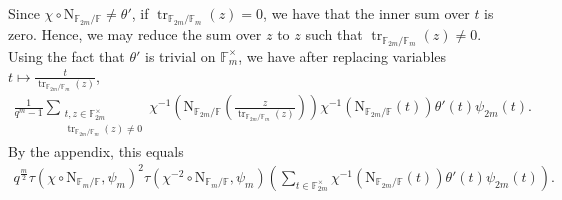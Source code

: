 \documentclass[12pt, reqno]{amsart}
\theoremstyle{definition}
\theoremstyle{definition}
\theoremstyle{definition}
\newcommand{\multiplicativegroup}[1]{#1^{\times}}
\newcommand{\fieldCharacter}{\psi}
\newcommand{\trace}{\operatorname{tr}}
\newcommand{\aFieldNorm}{\mathrm{N}}
\newcommand{\finiteField}{\mathbb{F}}
\newcommand{\finiteFieldExtension}[1]{\finiteField_{#1}}
\newcommand{\GaussSumSingleCharacter}[2]{\tau\left(#1, #2\right)}
\begin{document}
Since $\chi \circ \aFieldNorm_{\finiteFieldExtension{2m} \slash \finiteField} \ne \theta'$, if $\trace_{\finiteFieldExtension{2m} \slash \finiteFieldExtension{m}}\left(z\right) = 0$, we have that the inner sum over $t$ is zero. Hence, we may reduce the sum over $z$ to $z$ such that $\trace_{\finiteFieldExtension{2m} \slash \finiteFieldExtension{m}}\left(z\right) \ne 0$. Using the fact that $\theta'$ is trivial on $\multiplicativegroup{\finiteFieldExtension{m}}$, we have after replacing variables $t \mapsto \frac{t}{\trace_{\finiteFieldExtension{2m} \slash \finiteFieldExtension{m}}\left(z\right)}$,
\begin{align*}
	\frac{1}{q^m-1}\sum_{\substack{t,z \in \multiplicativegroup{\finiteFieldExtension{2m}}\\
			\trace_{\finiteFieldExtension{2m} \slash \finiteFieldExtension{m}}\left(z\right) \ne 0}} \chi^{-1}\left(\aFieldNorm_{\finiteFieldExtension{2m} \slash \finiteField}\left(\frac{z}{\trace_{\finiteFieldExtension{2m} \slash \finiteFieldExtension{m}}\left(z\right) }\right)\right) \chi^{-1}\left(\aFieldNorm_{\finiteFieldExtension{2m} \slash \finiteField}\left(t\right)\right) \theta' \left(t\right) \fieldCharacter_{2m}\left(t\right).
\end{align*}
By the appendix, this equals
\begin{align*}
	q^{\frac{m}{2}} \GaussSumSingleCharacter{\chi \circ \aFieldNorm_{\finiteFieldExtension{m} \slash \finiteField}}{\fieldCharacter_m}^2 \GaussSumSingleCharacter{\chi^{-2} \circ \aFieldNorm_{\finiteFieldExtension{m} \slash \finiteField}}{\fieldCharacter_m} \left(\sum_{t \in \multiplicativegroup{\finiteFieldExtension{2m}}} \chi^{-1}\left(\aFieldNorm_{\finiteFieldExtension{2m} \slash \finiteField}\left(t\right)\right) \theta' \left(t\right) \fieldCharacter_{2m}\left(t\right)\right).
\end{align*}
\end{document}
